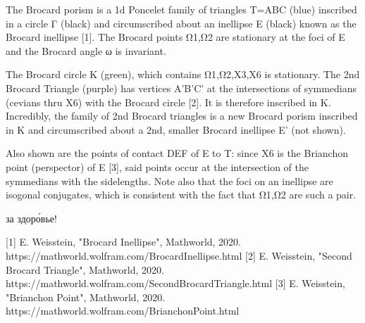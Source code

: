 The Brocard porism is a 1d Poncelet family of triangles T=ABC (blue) inscribed in a circle Γ (black) and circumscribed about an inellipse E (black) known as the Brocard inellipse [1]. The Brocard points Ω1,Ω2 are stationary at the foci of E and the Brocard angle ω is invariant.

The Brocard circle K (green), which contains Ω1,Ω2,X3,X6 is stationary. The 2nd Brocard Triangle (purple) has vertices A'B'C' at the intersections of symmedians (cevians thru X6) with the Brocard circle [2]. It is therefore inscribed in K. Incredibly, the family of 2nd Brocard triangles is a new Brocard porism inscribed in K and circumscribed about a 2nd, smaller Brocard inellipse E' (not shown).

Also shown are the points of contact DEF of E to T: since X6 is the Brianchon point (perspector) of E [3], said points occur at the intersection of the symmedians with the sidelengths. Note also that the foci on an inellipse are isogonal conjugates, which is consistent with the fact that Ω1,Ω2 are such a pair. 

за здоро́вье!

[1] E. Weisstein, "Brocard Inellipse", Mathworld, 2020. https://mathworld.wolfram.com/BrocardInellipse.html
[2] E. Weisstein, "Second Brocard Triangle", Mathworld, 2020. https://mathworld.wolfram.com/SecondBrocardTriangle.html
[3] E. Weisstein, "Brianchon Point", Mathworld, 2020. https://mathworld.wolfram.com/BrianchonPoint.html